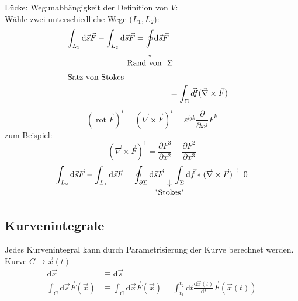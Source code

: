 \documentclass[a4paper]{scrartcl}
\DeclareMathOperator{\rot}{rot}
\renewcommand{\d}{\mathrm{d}}
\renewcommand{\v}[1]{\vec{#1}}
\theoremstyle{definition}
\theoremstyle{plain}
\theoremstyle{remark}
\theoremstyle{remark}
\begin{document}
Lücke: Wegunabhängigkeit der Definition von $V$: \\
     Wähle zwei unterschiedliche Wege ($L_1, L_2$):
\begin{align*}
\int_{L_1}\d\v s \v F - \int_{L_2}\d \v s \v F = \underarrow[\oint]{\text{Rand von } $\Sigma$} \d\v s\v F \\
\intertext{Satz von Stokes}
&= \int_{\Sigma}\v{d f}(\v\nabla \times\v F)
\end{align*}
\[(\rot \v F)^i = (\v\nabla \times \v F)^i = \varepsilon^{ijk}\frac{\partial}{\partial x^j} F^k\]
zum Beispiel:
\[(\v\nabla\times\v F)^1 = \frac{\partial F^3}{\partial x^2} - \frac{\partial F^2}{\partial x^3}\]
\[\int_{L_2}\d \v s \v F - \int_{L_1}\d \v s\v F = \oint_{\partial \Sigma} \d\v s \v F \underarrow[=]{\text{"Stokes"}} \int_{\Sigma}\d\v f*(\v\nabla\times\v F) \overset{!}{=} 0\]
\subsection{Kurvenintegrale}
\label{sec-4-4}
Jedes Kurvenintegral kann durch Parametrisierung der Kurve berechnet werden.
Kurve $C \to \v x(t)$
\begin{align*}
\d \v x &\equiv \d \v s \\
\int_C \d \v s \v F(\v x) &\equiv \int_C \d \v x \v F(\v x) = \int_{t_1}^{t_2} \d t \frac{\d \v x(t)}{\d t} \v F(\v x(t))
\end{align*}
\end{document}

